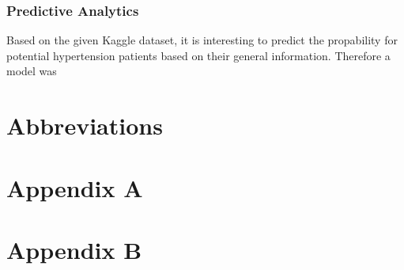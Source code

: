 \subsection{Predictive Analytics}
Based on the given Kaggle dataset, it is interesting to predict the propability for potential hypertension patients based on their general information. Therefore a model was 


\chapter{Abbreviations}


\printbibliography[heading=bibintoc]

\chapter{Appendix A}\label{appendix a}

\chapter{Appendix B}\label{appendix b}
%


